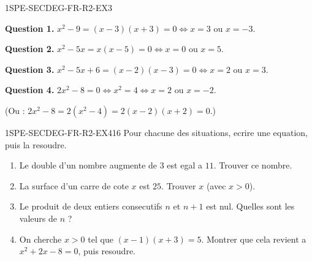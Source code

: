 
\begin{corrige}{1SPE-SECDEG-FR-R2-EX3}

\textbf{Question 1.} $x^2 - 9 = (x-3)(x+3) = 0 \Leftrightarrow x = 3$ ou $x = -3$.

\textbf{Question 2.} $x^2 - 5x = x(x-5) = 0 \Leftrightarrow x = 0$ ou $x = 5$.

\textbf{Question 3.} $x^2 - 5x + 6 = (x-2)(x-3) = 0 \Leftrightarrow x = 2$ ou $x = 3$.

\textbf{Question 4.} $2x^2 - 8 = 0 \Leftrightarrow x^2 = 4 \Leftrightarrow x = 2$ ou $x = -2$.

(Ou : $2x^2 - 8 = 2(x^2-4) = 2(x-2)(x+2) = 0$.)

\end{corrige}


\begin{exercice}{1SPE-SECDEG-FR-R2-EX4}{1}{6}
Pour chacune des situations, ecrire une equation, puis la resoudre.
\begin{enumerate}
  \item Le double d'un nombre augmente de $3$ est egal a $11$. Trouver ce nombre.
  \item La surface d'un carre de cote $x$ est $25$. Trouver $x$ (avec $x > 0$).
  \item Le produit de deux entiers consecutifs $n$ et $n+1$ est nul. Quelles sont les valeurs de $n$ ?
  \item On cherche $x > 0$ tel que $(x-1)(x+3) = 5$. Montrer que cela revient a $x^2 + 2x - 8 = 0$, puis resoudre.
\end{enumerate}
\end{exercice}


